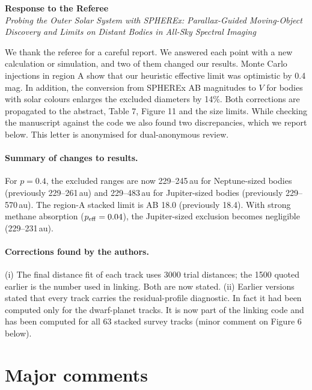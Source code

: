 \documentclass[11pt]{article}
\begin{document}
\begin{center}
{\large\bfseries Response to the Referee}\\[4pt]
\emph{Probing the Outer Solar System with SPHEREx: Parallax-Guided Moving-Object Discovery and Limits on Distant Bodies in All-Sky Spectral Imaging}
\end{center}

We thank the referee for a careful report. We answered each point with a new calculation or simulation, and two of them changed our results. Monte Carlo injections in region A show that our heuristic effective limit was optimistic by 0.4\,mag. In addition, the conversion from SPHEREx AB magnitudes to $V$ for bodies with solar colours enlarges the excluded diameters by 14\%. Both corrections are propagated to the abstract, Table 7, Figure 11 and the size limits. While checking the manuscript against the code we also found two discrepancies, which we report below. This letter is anonymised for dual-anonymous review.

\paragraph{Summary of changes to results.} For $p = 0.4$, the excluded ranges are now 229--245\,au for Neptune-sized bodies (previously 229--261\,au) and 229--483\,au for Jupiter-sized bodies (previously 229--570\,au). The region-A stacked limit is AB 18.0 (previously 18.4). With strong methane absorption ($p_{\rm eff} = 0.04$), the Jupiter-sized exclusion becomes negligible (229--231\,au).

\paragraph{Corrections found by the authors.} (i) The final distance fit of each track uses 3000 trial distances; the 1500 quoted earlier is the number used in linking. Both are now stated. (ii) Earlier versions stated that every track carries the residual-profile diagnostic. In fact it had been computed only for the dwarf-planet tracks. It is now part of the linking code and has been computed for all 63 stacked survey tracks (minor comment on Figure 6 below).

\section*{Major comments}
\end{document}
